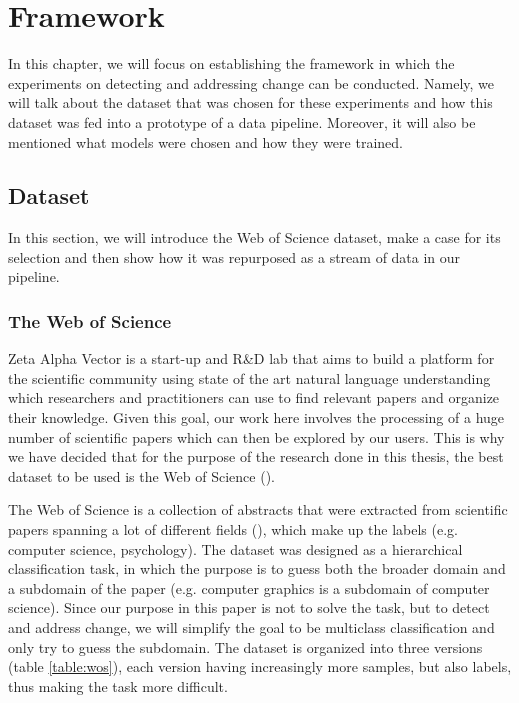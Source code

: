 \documentclass[12pt]{extreport}
\begin{document}
\chapter{Framework}

In this chapter, we will focus on establishing the framework in which the experiments on detecting and addressing change can be conducted. Namely, we will talk about the dataset that was chosen for these experiments and how this dataset was fed into a prototype of a data pipeline. Moreover, it will also be mentioned what models were chosen and how they were trained.

\section{Dataset}

In this section, we will introduce the Web of Science dataset, make a case for its selection and then show how it was repurposed as a stream of data in our pipeline.

\subsection{The Web of Science} \label{wos}

Zeta Alpha Vector is a start-up and R\&D lab that aims to build a platform for the scientific community using state of the art natural language understanding which researchers and practitioners can use to find relevant papers and organize their knowledge. Given this goal, our work here involves the processing of a huge number of scientific papers which can then be explored by our users. This is why we have decided that for the purpose of the research done in this thesis, the best dataset to be used is the Web of Science (\cite{wos}).

The Web of Science is a collection of abstracts that were extracted from scientific papers spanning a lot of different fields (\cite{wos}), which make up the labels (e.g. computer science, psychology). The dataset was designed as a hierarchical classification task, in which the purpose is to guess both the broader domain and a subdomain of the paper (e.g. computer graphics is a subdomain of computer science). Since our purpose in this paper is not to solve the task, but to detect and address change, we will simplify the goal to be multiclass classification and only try to guess the subdomain. The dataset is organized into three versions (table \ref{table:wos}), each version having increasingly more samples, but also labels, thus making the task more difficult.
\end{document}

